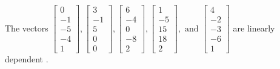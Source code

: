 \begin{exercise}
\begin{exerciseStatement}
  \end{exerciseStatement}
  \begin{exerciseAnswer}
   The vectors \(\left[\begin{array}{r}
0 \\
-1 \\
-5 \\
-4 \\
1
\end{array}\right] , \left[\begin{array}{r}
3 \\
-1 \\
5 \\
0 \\
0
\end{array}\right] , \left[\begin{array}{r}
6 \\
-4 \\
0 \\
-8 \\
2
\end{array}\right] , \left[\begin{array}{r}
1 \\
-5 \\
15 \\
18 \\
2
\end{array}\right] , \text{ and } \left[\begin{array}{r}
4 \\
-2 \\
-3 \\
-6 \\
1
\end{array}\right]\) are 
  	 linearly dependent  .
  


  \end{exerciseAnswer}
\end{exercise}